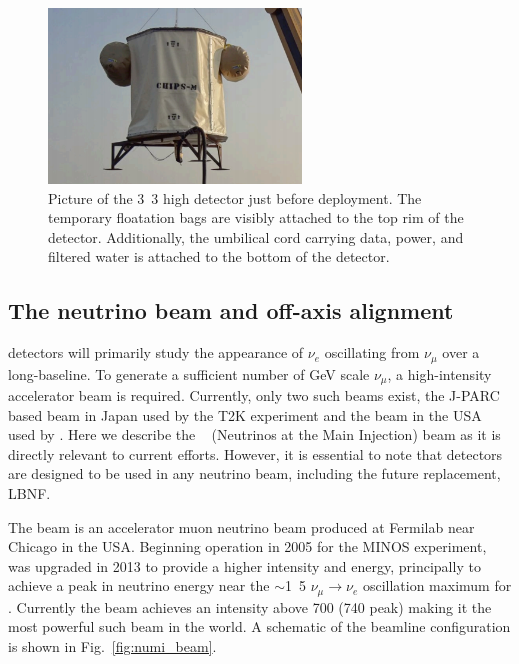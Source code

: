 \begin{figure} %
    \includegraphics[width=0.6\textwidth]{diagrams/4-chips/chips_m.png}
    \caption[Picture of the \chipsm detector.]
    {Picture of the \unit{3.3}{} high \chipsm detector just before deployment. The
        temporary floatation bags are visibly attached to the top rim of the detector.
        Additionally, the umbilical cord carrying data, power, and filtered water is attached to
        the bottom of the detector.}
    \label{fig:chips_m}
\end{figure}

\subsection{The neutrino beam and off-axis alignment} %
\label{sec:chips_concept_beam} %

\chips detectors will primarily study the appearance of $\nu_{e}$ oscillating from $\nu_{\mu}$
over a long-baseline. To generate a sufficient number of GeV scale $\nu_{\mu}$, a high-intensity
accelerator beam is required. Currently, only two such beams exist, the J-PARC based beam in Japan
used by the T2K experiment and the \numi beam in the USA used by \nova. Here we describe the
\numi~\cite{adamson2016} (Neutrinos at the Main Injection) beam as it is directly relevant to
current \chips efforts. However, it is essential to note that \chips detectors are designed to be
used in any neutrino beam, including the future \numi replacement, LBNF.

The \numi beam is an accelerator muon neutrino beam produced at Fermilab near Chicago in the USA.
Beginning operation in 2005 for the MINOS experiment, \numi was upgraded in 2013 to provide a
higher intensity and energy, principally to achieve a peak in neutrino energy near the
$\sim$\unit{1.5}{\GeV} $\nu_{\mu}\rightarrow\nu_{e}$ oscillation maximum for \nova. Currently the
\numi beam achieves an intensity above \unit{700}{} (\unit{740}{} peak)
making it the most powerful such beam in the world. A schematic of the \numi beamline
configuration is shown in Fig.~\ref{fig:numi_beam}.

